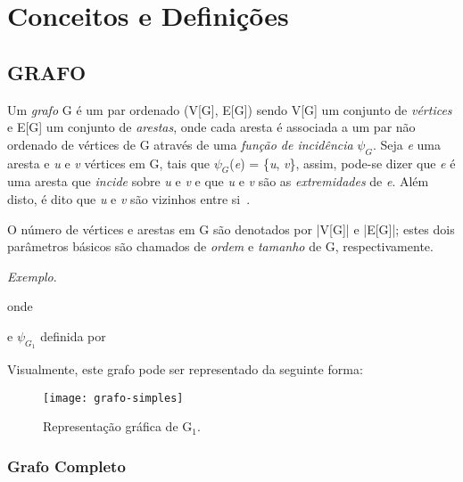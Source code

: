 \chapter{Conceitos e Definições}
\label{conceitos}

\section{\texorpdfstring{\MakeUppercase{Grafo}}{}}
\label{conceitos__grafo}

Um \emph{grafo} G é um par ordenado (V[G], E[G]) sendo V[G] um conjunto de \emph{vértices} e E[G] um conjunto de \emph{arestas}, onde cada aresta é associada a um par não ordenado de vértices de G através de uma \emph{função de incidência} $\psi_{G}$. Seja \emph{e} uma aresta e \emph{u} e \emph{v} vértices em G, tais que $\psi_{G}$(\emph{e}) = \{\emph{u}, \emph{v}\}, assim, pode-se dizer que \emph{e} é uma aresta que \emph{incide} sobre \emph{u} e \emph{v} e que \emph{u} e \emph{v} são as \emph{extremidades} de \emph{e}. Além disto, é dito que \emph{u} e \emph{v} são vizinhos entre si~\cite{bondy1976graph}.

O número de vértices e arestas em G são denotados por |V[G]| e |E[G]|; estes
dois parâmetros básicos são chamados de \emph{ordem} e \emph{tamanho} de G, respectivamente.

\noindent\emph{Exemplo}.


\noindent onde



\noindent e $\psi_{G_{1}}$ definida por



Visualmente, este grafo pode ser representado da seguinte forma:

\begin{figure}[H]
\texttt{[image: grafo-simples]}
\centering
\caption{Representação gráfica de G$_{1}$.}
\end{figure}

\subsection{Grafo Completo}
\label{conceitos__grafo--comleto}

